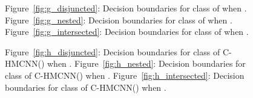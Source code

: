 \documentclass{article}
\newcommand{\system}[1]{C-HMCNN(#1)}
\begin{document}
\begin{figure}[h]
    \centering
     \caption{Figure~\ref{fig:g_disjuncted}: Decision boundaries for class  of  when . Figure~\ref{fig:g_nested}: Decision boundaries for class  of  when . Figure~\ref{fig:g_intersected}: Decision boundaries for class  of  when .}
\end{figure}

\begin{figure}[h]
    \centering
     \caption{Figure~\ref{fig:h_disjuncted}: Decision boundaries for class  of \system{} when . Figure~\ref{fig:h_nested}: Decision boundaries for class  of \system{} when . Figure~\ref{fig:h_intersected}: Decision boundaries for class  of \system{} when .}
\end{figure}
\end{document}
